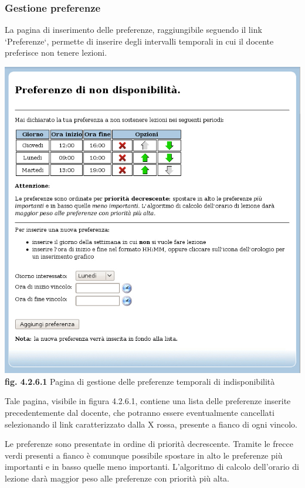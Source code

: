 \documentclass[11pt,a4paper]{article}
\begin{document}
\subsubsection{Gestione preferenze}
La pagina di inserimento delle preferenze, raggiungibile seguendo il link `Preferenze`, permette di inserire degli intervalli temporali in cui il docente preferisce non tenere lezioni.

\begin{center}
	\includegraphics[scale=0.5]{images/preferenze_docente.jpg}\\
	\textbf{fig. 4.2.6.1} Pagina di gestione delle preferenze temporali di indisponibilità\\
\end{center}
\bigskip

Tale pagina, visibile in figura 4.2.6.1, contiene una lista delle preferenze inserite precedentemente dal docente, che potranno essere eventualmente cancellati selezionando il link caratterizzato dalla X rossa, presente a fianco di ogni vincolo.

Le preferenze sono presentate in ordine di priorità decrescente. Tramite le frecce verdi presenti a fianco è comunque possibile spostare in alto le preferenze più importanti e in basso quelle meno importanti. L'algoritmo di calcolo dell'orario di lezione darà maggior peso alle preferenze con priorità più alta.
\end{document}
